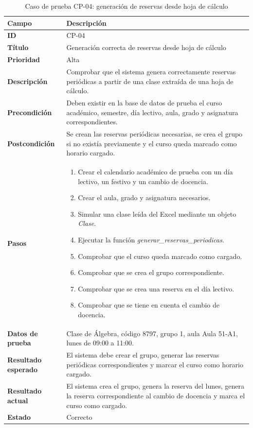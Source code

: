\begin{table}[H]
	\centering
	\small
	\renewcommand{\arraystretch}{1.2}
	\begin{tabularx}{\textwidth}{@{}p{3.5cm}X@{}}
		\toprule
		\textbf{Campo} & \textbf{Descripción} \\
		\midrule
		\textbf{ID} & CP-04 \\
		\textbf{Título} & Generación correcta de reservas desde hoja de cálculo \\
		\textbf{Prioridad} & Alta \\
		\textbf{Descripción} & Comprobar que el sistema genera correctamente reservas periódicas a partir de una clase extraída de una hoja de cálculo. \\
		\textbf{Precondición} & Deben existir en la base de datos de prueba el curso académico, semestre, día lectivo, aula, grado y asignatura correspondientes. \\
		\textbf{Postcondición} & Se crean las reservas periódicas necesarias, se crea el grupo si no existía previamente y el curso queda marcado como horario cargado. \\
		\textbf{Pasos} &
		\begin{enumerate}
			\item Crear el calendario académico de prueba con un día lectivo, un festivo y un cambio de docencia.
			\item Crear el aula, grado y asignatura necesarios.
			\item Simular una clase leída del Excel mediante un objeto \textit{Clase}.
			\item Ejecutar la función \textit{generar\_reservas\_periodicas}.
			\item Comprobar que el curso queda marcado como cargado.
			\item Comprobar que se crea el grupo correspondiente.
			\item Comprobar que se crea una reserva en el día lectivo.
			\item Comprobar que se tiene en cuenta el cambio de docencia.
		\end{enumerate} \\
		\textbf{Datos de prueba} & Clase de Álgebra, código 8797, grupo 1, aula Aula 51-A1, lunes de 09:00 a 11:00. \\
		\textbf{Resultado esperado} & El sistema debe crear el grupo, generar las reservas periódicas correspondientes y marcar el curso como horario cargado. \\
		\textbf{Resultado actual} & El sistema crea el grupo, genera la reserva del lunes, genera la reserva correspondiente al cambio de docencia y marca el curso como cargado. \\
		\textbf{Estado} & Correcto \\
		\bottomrule
	\end{tabularx}
	\caption{Caso de prueba CP-04: generación de reservas desde hoja de cálculo}
	\label{tab}
\end{table}



